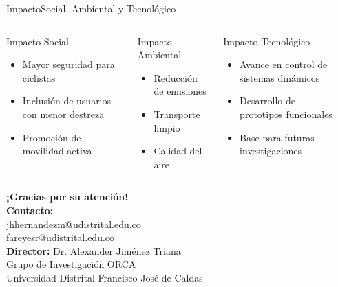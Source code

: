 \documentclass[10pt,xcolor={dvipsnames}]{beamer}
\begin{document}
\begin{frame}{Impacto}{Social, Ambiental y Tecnológico}

\begin{columns}
\begin{block}{Impacto Social}
\begin{itemize}
    \item Mayor seguridad para ciclistas
    \item Inclusión de usuarios con menor destreza
    \item Promoción de movilidad activa
\end{itemize}
\end{block}

\begin{block}{Impacto Ambiental}
\begin{itemize}
    \item Reducción de emisiones
    \item Transporte limpio
    \item Calidad del aire
\end{itemize}
\end{block}

\begin{block}{Impacto Tecnológico}
\begin{itemize}
    \item Avance en control de sistemas dinámicos
    \item Desarrollo de prototipos funcionales
    \item Base para futuras investigaciones
\end{itemize}
\end{block}

\vspace{0.3cm}

\begin{center}
\end{center}
\end{columns}
\end{frame}


\begin{frame}[plain]
  \begin{center}
  \Large \textbf{¡Gracias por su atención!}\\[1em]
  \normalsize
  \textbf{Contacto:}\\
  jhhernandezm@udistrital.edu.co\\
  fareyesr@udistrital.edu.co\\[1em]
  \textbf{Director:} Dr. Alexander Jiménez Triana\\
  Grupo de Investigación ORCA\\
  Universidad Distrital Francisco José de Caldas
  \end{center}
\end{frame}
\end{document}
